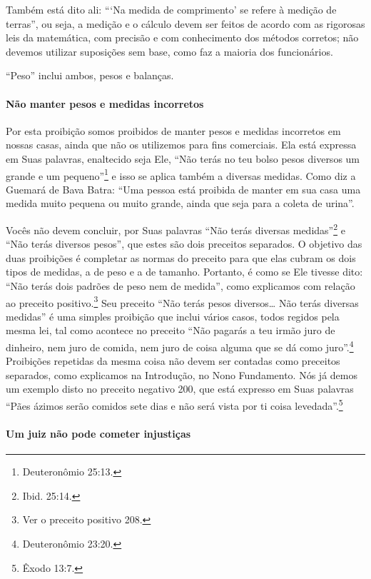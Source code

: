 \begin{multicols}{2}
Também está dito ali: ```Na medida de comprimento' se refere à medição
de terras'', ou seja, a medição e o cálculo devem ser feitos de acordo
com as rigorosas leis da matemática, com precisão e com conhecimento dos
métodos corretos; não devemos utilizar suposições sem base, como faz a
maioria dos funcionários.

``Peso'' inclui ambos, pesos e balanças.

\paragraph{Não manter pesos e medidas incorretos}

Por esta proibição somos proibidos de manter pesos e medidas incorretos
em nossas casas, ainda que não os utilizemos para fins comerciais. Ela
está expressa em Suas palavras, enaltecido seja Ele, ``Não terás no teu
bolso pesos diversos um grande e um pequeno''\footnote{Deuteronômio 25:13.} e
isso se aplica também a diversas medidas. Como diz a Guemará\starr{} de Bava
Batra\starr: ``Uma pessoa está proibida de manter em sua casa uma medida muito
pequena ou muito grande, ainda que seja para a coleta de urina''.

Vocês não devem concluir, por Suas palavras ``Não terás diversas
medidas''\footnote{Ibid. 25:14.} e ``Não terás diversos pesos'', que estes são
dois preceitos separados. O objetivo das duas proibições é completar as
normas do preceito para que elas cubram os dois tipos de medidas, a de
peso e a de tamanho. Portanto, é como se Ele tivesse dito: ``Não terás
dois padrões de peso nem de medida'', como explicamos com relação ao
preceito positivo.\footnote{Ver o preceito positivo 208.} Seu preceito ``Não terás pesos
diversos\ldots{} Não terás diversas medidas'' é uma simples proibição que
inclui vários casos, todos regidos pela mesma lei, tal como acontece no
preceito ``Não pagarás a teu irmão juro de dinheiro, nem juro de comida,
nem juro de coisa alguma que se dá como juro''.\footnote{Deuteronômio 23:20.}
Proibições repetidas da mesma coisa não devem ser contadas como
preceitos separados, como explicamos na Introdução, no Nono Fundamento.
Nós já demos um exemplo disto no preceito negativo 200, que está
expresso em Suas palavras ``Pães ázimos serão comidos sete dias e não
será vista por ti coisa levedada''.\footnote{Êxodo 13:7.}

\paragraph{Um juiz não pode cometer injustiças}


\end{multicols}
